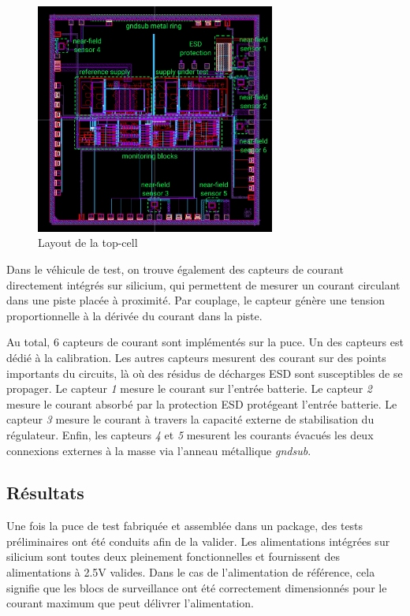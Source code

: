 \begin{figure}[!h]
  \centering
  \includegraphics[width=0.7\textwidth]{src/1/figures/topcell_layout.pdf}
  \caption{Layout de la top-cell}
  \label{fig:top-cell-layout}
\end{figure}

Dans le véhicule de test, on trouve également des capteurs de courant directement intégrés sur silicium, qui permettent de mesurer un courant circulant dans une piste placée à proximité.
Par couplage, le capteur génère une tension proportionnelle à la dérivée du courant dans la piste.

Au total, 6 capteurs de courant sont implémentés sur la puce.
Un des capteurs est dédié à la calibration.
Les autres capteurs mesurent des courant sur des points importants du circuits, là où des résidus de décharges ESD sont susceptibles de se propager.
Le capteur \textit{1} mesure le courant sur l'entrée batterie.
Le capteur \textit{2} mesure le courant absorbé par la protection ESD protégeant l'entrée batterie.
Le capteur \textit{3} mesure le courant à travers la capacité externe de stabilisation du régulateur.
Enfin, les capteurs \textit{4} et \textit{5} mesurent les courants évacués les deux connexions externes à la masse via l'anneau métallique \textit{gndsub}.

\subsection{Résultats}

Une fois la puce de test fabriquée et assemblée dans un package, des tests préliminaires ont été conduits afin de la valider.
Les alimentations intégrées sur silicium sont toutes deux pleinement fonctionnelles et fournissent des alimentations à 2.5V valides.
Dans le cas de l'alimentation de référence, cela signifie que les blocs de surveillance ont été correctement dimensionnés pour le courant maximum que peut délivrer l'alimentation.

